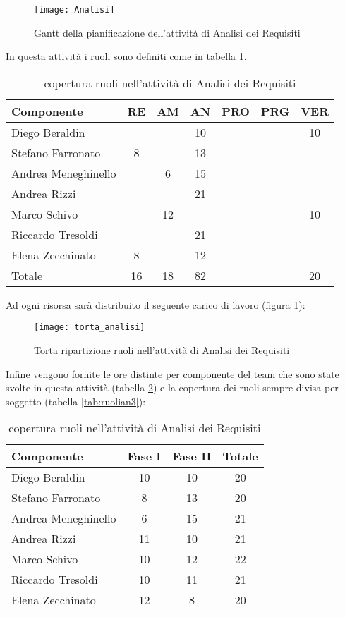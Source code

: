 \begin{figure}[h!]
  \texttt{[image: Analisi]}
\caption{Gantt della pianificazione dell'attività di Analisi dei Requisiti}
\end{figure}
\clearpage
In questa attività i ruoli sono definiti come in tabella \ref{tab:ruolian}.
\begin{table}[h!]
\centering
\begin{tabular}{|l|c|c|c|c|c|c|}
\hline
Componente& RE& AM& AN& PRO& PRG& VER\\
\hline
Diego Beraldin & & & 10& & & 10\\
Stefano Farronato & 8& & 13& & & \\
Andrea Meneghinello & & 6& 15& & & \\
Andrea Rizzi & & & 21& & & \\
Marco Schivo & & 12& & & & 10\\
Riccardo Tresoldi & & & 21& & & \\
Elena Zecchinato & 8& & 12& & & \\
\hline
Totale & 16& 18& 82& & & 20\\
\hline
\end{tabular}
\caption{copertura ruoli nell'attività di Analisi dei Requisiti}\label{tab:ruolian}
\end{table}

Ad ogni risorsa sarà distribuito il seguente carico di lavoro (figura \ref{fig:ruolian}):

\begin{figure}[h!]
\centering
  \texttt{[image: torta\_analisi]}
\caption{Torta ripartizione ruoli nell'attività di Analisi dei Requisiti}\label{fig:ruolian}
\end{figure}
\clearpage

Infine vengono fornite le ore distinte per componente del team che sono state svolte in questa attività (tabella \ref{tab:ruolian2}) e la copertura dei ruoli sempre divisa per soggetto (tabella \ref{tab:ruolian3}):

\begin{table}[h!]
\centering
\begin{tabular}{|l|c|c|c|}
\hline
Componente& Fase I& Fase II& Totale\\
\hline
Diego Beraldin &10 &10 & 20\\
Stefano Farronato & 8& 13& 20\\
Andrea Meneghinello & 6& 15& 21\\
Andrea Rizzi & 11& 10& 21\\
Marco Schivo & 10& 12& 22\\
Riccardo Tresoldi & 10& 11& 21\\
Elena Zecchinato & 12& 8& 20\\
\hline
\end{tabular}
\caption{copertura ruoli nell'attività di Analisi dei Requisiti}\label{tab:ruolian2}
\end{table}

